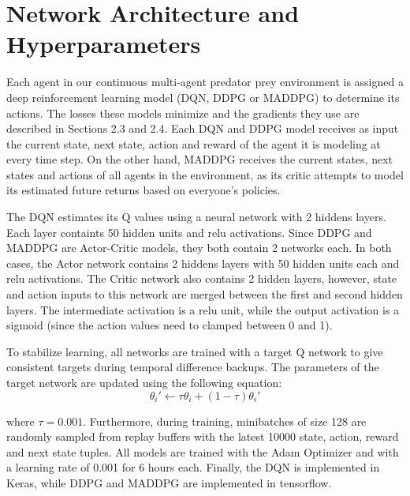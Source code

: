 
\section{Network Architecture and Hyperparameters}

Each agent in our continuous multi-agent predator prey environment is assigned a deep reinforcement learning model (DQN, DDPG or MADDPG) to determine its actions. The losses these models minimize and the gradients they use are described in Sections 2.3 and 2.4. Each DQN and DDPG model receives as input the current state, next state, action and reward of the agent it is modeling at every time step. On the other hand, MADDPG receives the current states, next states and actions of all agents in the environment, as its critic attempts to model its estimated future returns based on everyone's policies. 

The DQN estimates its Q values using a neural network with 2 hiddens layers. Each layer containts 50 hidden units and relu activations. Since DDPG and MADDPG are Actor-Critic models, they both contain 2 networks each. In both cases, the Actor network contains 2 hiddens layers with 50 hidden units each and relu activations. The Critic network also contains 2 hidden layers, however, state and action inputs to this network are merged between the first and second hidden layers. The intermediate activation is a relu unit, while the output activation is a sigmoid (since the action values need to clamped between 0 and 1). 

To stabilize learning, all networks are trained with a target Q network to give consistent targets during temporal difference backups. The parameters of the target network are updated using the following equation:
\begin{equation}
\theta_{i}' \leftarrow \tau\theta_{i} + (1 - \tau)\theta_{i}'
\end{equation}

where $\tau = 0.001$. Furthermore, during training, minibatches of size 128 are randomly sampled from replay buffers with the latest 10000 state, action, reward and next state tuples. All models are trained with the Adam Optimizer and with a learning rate of 0.001 for 6 hours each. Finally, the DQN is implemented in Keras, while DDPG and MADDPG are implemented in tensorflow. 

